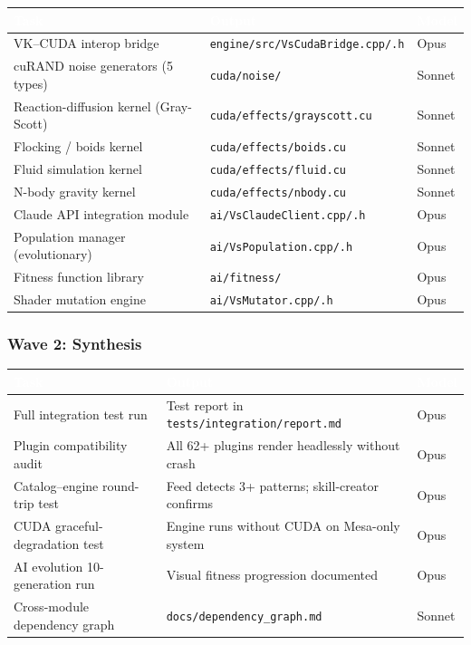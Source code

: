 \documentclass[11pt,letterpaper]{article}
\newcommand{\tableheader}[1]{\textbf{\sffamily\textcolor{white}{#1}}}
\begin{document}
\begin{center}
\begin{tabularx}{\textwidth}{L{3.5cm}XC{1.5cm}}
\toprule
{}
\tableheader{Task} & \tableheader{Output} & \tableheader{Model} \\
\midrule
VK--CUDA interop bridge & \texttt{engine/src/VsCudaBridge.cpp/.h} & Opus \\
cuRAND noise generators (5 types) & \texttt{cuda/noise/} & Sonnet \\
Reaction-diffusion kernel (Gray-Scott) & \texttt{cuda/effects/grayscott.cu} & Sonnet \\
Flocking / boids kernel & \texttt{cuda/effects/boids.cu} & Sonnet \\
Fluid simulation kernel & \texttt{cuda/effects/fluid.cu} & Sonnet \\
N-body gravity kernel & \texttt{cuda/effects/nbody.cu} & Sonnet \\
Claude API integration module & \texttt{ai/VsClaudeClient.cpp/.h} & Opus \\
Population manager (evolutionary) & \texttt{ai/VsPopulation.cpp/.h} & Opus \\
Fitness function library & \texttt{ai/fitness/} & Opus \\
Shader mutation engine & \texttt{ai/VsMutator.cpp/.h} & Opus \\
\bottomrule
\end{tabularx}
\end{center}

\subsubsection{Wave 2: Synthesis}

\begin{center}
\begin{tabularx}{\textwidth}{L{3.5cm}XC{1.5cm}}
\toprule
{}
\tableheader{Task} & \tableheader{Output} & \tableheader{Model} \\
\midrule
Full integration test run & Test report in \texttt{tests/integration/report.md} & Opus \\
Plugin compatibility audit & All 62+ plugins render headlessly without crash & Opus \\
Catalog--engine round-trip test & Feed detects 3+ patterns; skill-creator confirms & Opus \\
CUDA graceful-degradation test & Engine runs without CUDA on Mesa-only system & Opus \\
AI evolution 10-generation run & Visual fitness progression documented & Opus \\
Cross-module dependency graph & \texttt{docs/dependency\_graph.md} & Sonnet \\
\bottomrule
\end{tabularx}
\end{center}
\end{document}
